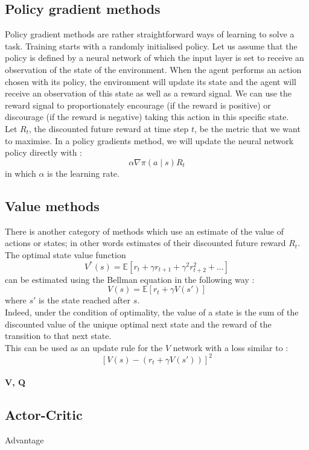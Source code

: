 \subsection{Policy gradient methods}
Policy gradient methods are rather straightforward ways of learning to solve a task.
Training starts with a randomly initialised policy. Let us assume that the
policy is defined by a neural network of which the input layer is set to 
receive an observation of the state of the environment. 
When the agent performs an action chosen with its policy, the environment will
update its state and the agent will receive an observation of this state as
well as a reward signal. We can use the reward signal to proportionately
encourage (if the reward is 
positive) or discourage (if the reward is negative) taking this action in 
this specific state. \\

Let $R_t$, the discounted future reward at time step $t$, be the metric
that we want to maximise. In a policy gradients method, we will update the
neural network policy directly with :
$$\alpha \nabla \pi(a \mid s) R_t$$
in which $\alpha$ is the learning rate.

\subsection{Value methods}
There is another category of methods which use an estimate of the value of
actions or states; in other words estimates of their discounted future reward
$R_t$.\\

The optimal state value function 
$$ V^*(s) = \mathbb{E}\left[ r_t + \gamma r_{t+1} + \gamma^2 r_{t+2}^2 + ...  \right]$$
can be estimated using the Bellman equation in the following way :
$$ V(s) = \mathbb{E}\left[ r_t + \gamma V(s')\right]$$
where $s'$ is the state reached after $s$.\\

Indeed, under the condition of optimality, the value of a state is the sum of
the discounted value of the unique optimal next state and the reward of the 
transition to that next state.\\

This can be used as an update rule for the $V$ network with a loss similar to :
$$ \left[V(s) -  \left(r_t + \gamma V(s') \right)\right]^2 $$

\paragraph{V, Q}

\subsection{Actor-Critic}



Advantage

